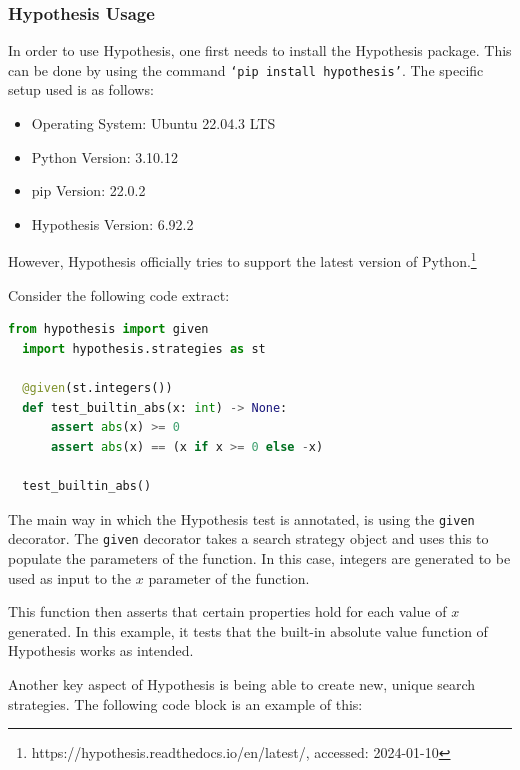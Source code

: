 \documentclass[runningheads]{llncs}
\begin{document}
\subsubsection{Hypothesis Usage}
In order to use Hypothesis, one first needs to install the Hypothesis package. This can be done by using the command \texttt{`pip install hypothesis'}. The specific setup used is as follows:

\begin{itemize}
  \item Operating System: Ubuntu 22.04.3 LTS
  \item Python Version: 3.10.12
  \item pip Version: 22.0.2
  \item Hypothesis Version: 6.92.2
\end{itemize}
However, Hypothesis officially tries to support the latest version of Python.\footnote{https://hypothesis.readthedocs.io/en/latest/, accessed: 2024-01-10}

\vspace{5mm}
\noindent Consider the following code extract:
\begin{lstlisting}[language=Python,caption={Basic Test from code/tutorial.ipynb}]
  from hypothesis import given
  import hypothesis.strategies as st

  @given(st.integers())
  def test_builtin_abs(x: int) -> None:
      assert abs(x) >= 0
      assert abs(x) == (x if x >= 0 else -x)

  test_builtin_abs()
\end{lstlisting}
The main way in which the Hypothesis test is annotated, is using the \texttt{given} decorator. The \texttt{given} decorator takes a search strategy object and uses this to populate the parameters of the function. In this case, integers are generated to be used as input to the $x$ parameter of the function.

This function then asserts that certain properties hold for each value of $x$ generated. In this example, it tests that the built-in absolute value function of Hypothesis works as intended.

\vspace{5mm}
\noindent Another key aspect of Hypothesis is being able to create new, unique search strategies. The following code block is an example of this:
\end{document}
